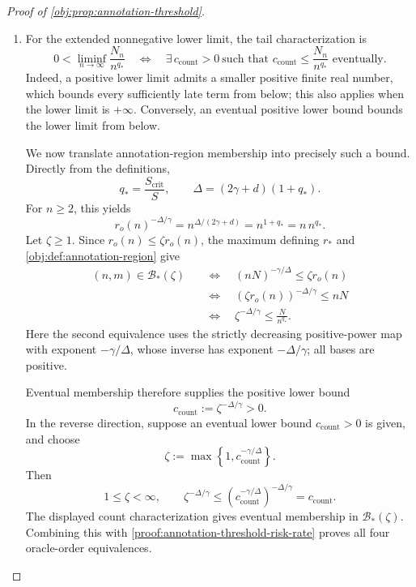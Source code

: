 \begin{proof}[Proof of \cref{obj:prop:annotation-threshold}]
\begin{enumerate}
\item
For the extended nonnegative lower limit, the tail characterization is
\[
0<\liminf_{n\to\infty}\frac{N_n}{n^{q_*}}
\quad\Longleftrightarrow\quad
\exists\,c_{\mathrm{count}}>0\
\text{such that }
c_{\mathrm{count}}\le\frac{N_n}{n^{q_*}}
\text{ eventually}.
\]
Indeed, a positive lower limit admits a smaller positive finite real number, which bounds every sufficiently late term from below; this also applies when the lower limit is \(+\infty\). Conversely, an eventual positive lower bound bounds the lower limit from below.

We now translate annotation-region membership into precisely such a bound. Directly from the definitions,
\[
q_*=\frac{S_{\mathrm{crit}}}{S},
\qquad
\Delta=(2\gamma+d)(1+q_*).
\]
For \(n\ge2\), this yields
\[
r_o(n)^{-\Delta/\gamma}
=n^{\Delta/(2\gamma+d)}
=n^{1+q_*}
=n\,n^{q_*}.
\]
Let \(\zeta\ge1\). Since \(r_o(n)\le\zeta r_o(n)\), the maximum defining \(r_*\) and
\cref{obj:def:annotation-region} give
\[
\begin{aligned}
(n,m)\in\mathcal B_*(\zeta)
&\quad\Longleftrightarrow\quad
(nN)^{-\gamma/\Delta}\le\zeta r_o(n)\\
&\quad\Longleftrightarrow\quad
(\zeta r_o(n))^{-\Delta/\gamma}\le nN\\
&\quad\Longleftrightarrow\quad
\zeta^{-\Delta/\gamma}\le\frac{N}{n^{q_*}}.
\end{aligned}
\]
Here the second equivalence uses the strictly decreasing positive-power map with exponent \(-\gamma/\Delta\), whose inverse has exponent \(-\Delta/\gamma\); all bases are positive.

Eventual membership therefore supplies the positive lower bound
\[
c_{\mathrm{count}}:=\zeta^{-\Delta/\gamma}>0.
\]
In the reverse direction, suppose an eventual lower bound \(c_{\mathrm{count}}>0\) is given, and choose
\[
\zeta:=\max\left\{1,c_{\mathrm{count}}^{-\gamma/\Delta}\right\}.
\]
Then
\[
1\le\zeta<\infty,
\qquad
\zeta^{-\Delta/\gamma}
\le
\left(c_{\mathrm{count}}^{-\gamma/\Delta}\right)^{-\Delta/\gamma}
=c_{\mathrm{count}}.
\]
The displayed count characterization gives eventual membership in
\(\mathcal B_*(\zeta)\). Combining this with \cref{proof:annotation-threshold-risk-rate} proves all four oracle-order equivalences.


\end{enumerate}
\end{proof}
